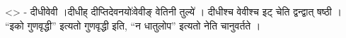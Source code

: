 \textless{}\textgreater{} - दीधीवेवी ।दीधीह् दीप्तिदेवनयोः॑वेवीङ् वेतिनी
तुल्ये॑ । दीधीश्च वेवीश्च इट् चेति द्वन्द्वात् षष्ठी । ``इको गुणवृद्धी''
इत्यतो गुणवृद्धी इति, ``न धातुलोप'' इत्यतो नेति चानुवर्तते ।
